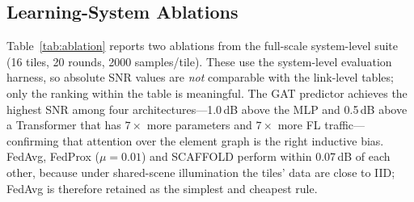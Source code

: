 \documentclass[conference]{IEEEtran}
\newcommand{\dB}{\,dB\xspace}
\begin{document}
\subsection{Learning-System Ablations}

Table~\ref{tab:ablation} reports two ablations from the full-scale system-level suite (16 tiles, 20 rounds, 2000 samples/tile). These use the system-level evaluation harness, so absolute SNR values are \emph{not} comparable with the link-level tables; only the ranking within the table is meaningful. The GAT predictor achieves the highest SNR among four architectures---1.0\dB above the MLP and 0.5\dB above a Transformer that has $7\times$ more parameters and $7\times$ more FL traffic---confirming that attention over the element graph is the right inductive bias. FedAvg, FedProx ($\mu=0.01$) and SCAFFOLD perform within 0.07\dB of each other, because under shared-scene illumination the tiles' data are close to IID; FedAvg is therefore retained as the simplest and cheapest rule.

\begin{table}[t]
\centering
\caption{Ablations (Full-Scale System-Level Suite)}
\label{tab:ablation}
\renewcommand{\arraystretch}{1.1}
\setlength{\tabcolsep}{4pt}
\footnotesize
{}
\end{table}
\end{document}
